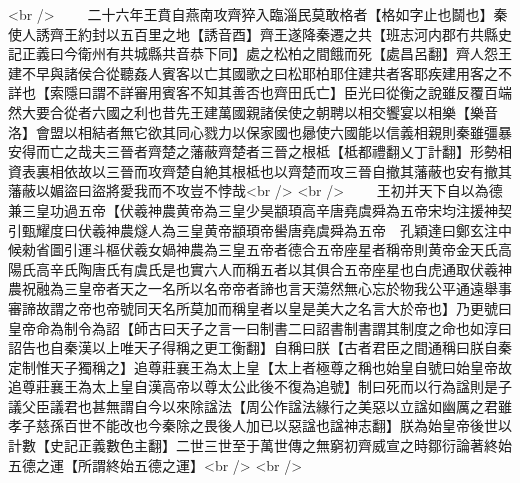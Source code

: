 <br />
　　二十六年王賁自燕南攻齊猝入臨淄民莫敢格者【格如字止也鬬也】秦使人誘齊王約封以五百里之地【誘音酉】齊王遂降秦遷之共【班志河内郡冇共縣史記正義曰今衛州有共城縣共音恭下同】處之松柏之間餓而死【處昌呂翻】齊人怨王建不早與諸侯合從聽姦人賓客以亡其國歌之曰松耶柏耶住建共者客耶疾建用客之不詳也【索隱曰謂不詳審用賓客不知其善否也齊田氏亡】臣光曰從衡之說雖反覆百端然大要合從者六國之利也昔先王建萬國親諸侯使之朝聘以相交饗宴以相樂【樂音洛】會盟以相結者無它欲其同心戮力以保家國也曏使六國能以信義相親則秦雖彊暴安得而亡之哉夫三晉者齊楚之藩蔽齊楚者三晉之根柢【柢都禮翻乂丁計翻】形勢相資表裏相依故以三晉而攻齊楚自絶其根柢也以齊楚而攻三晉自撤其藩蔽也安有撤其藩蔽以媚盜曰盜將愛我而不攻豈不悖哉<br />
<br />
　　王初并天下自以為德兼三皇功過五帝【伏羲神農黄帝為三皇少昊顓頊高辛唐堯虞舜為五帝宋均注援神契引甄耀度曰伏羲神農燧人為三皇黄帝顓頊帝嚳唐堯虞舜為五帝　孔穎達曰鄭玄注中候勑省圖引運斗樞伏羲女媧神農為三皇五帝者德合五帝座星者稱帝則黄帝金天氏高陽氏高辛氏陶唐氏有虞氏是也實六人而稱五者以其俱合五帝座星也白虎通取伏羲神農祝融為三皇帝者天之一名所以名帝帝者諦也言天蕩然無心忘於物我公平通遠舉事審諦故謂之帝也帝號同天名所莫加而稱皇者以皇是美大之名言大於帝也】乃更號曰皇帝命為制令為詔【師古曰天子之言一曰制書二曰詔書制書謂其制度之命也如淳曰詔告也自秦漢以上唯天子得稱之更工衡翻】自稱曰朕【古者君臣之間通稱曰朕自秦定制惟天子獨稱之】追尊莊襄王為太上皇【太上者極尊之稱也始皇自號曰始皇帝故追尊莊襄王為太上皇自漢高帝以尊太公此後不復為追號】制曰死而以行為諡則是子議父臣議君也甚無謂自今以來除諡法【周公作諡法緣行之美惡以立諡如幽厲之君雖孝子慈孫百世不能改也今秦除之畏後人加已以惡諡也諡神志翻】朕為始皇帝後世以計數【史記正義數色主翻】二世三世至于萬世傳之無窮初齊威宣之時鄒衍論著終始五德之運【所謂終始五德之運】<br />
<br />
